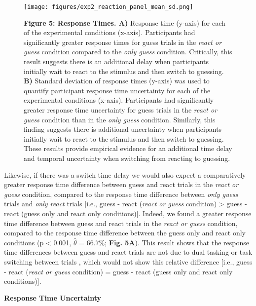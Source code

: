\documentclass[12pt]{article}
\newcommand\boldblue[1]{\textcolor{mydarkblue}{\textbf{#1}}}
\begin{document}
\begin{figure}[H]
    \centering
    \texttt{[image: figures/exp2\_reaction\_panel\_mean\_sd.png]}
    \caption*{\boldblue{Figure 5: Response Times. A)} Response time (y-axis) for each of the experimental conditions (x-axis). Participants had significantly greater response times for guess trials in the \emph{react or guess} condition compared to the \emph{only guess} condition. Critically, this result suggests there is an additional delay when participants initially wait to react to the stimulus and then switch to guessing. \boldblue{B)} Standard deviation of response times (y-axis) was used to quantify participant response time uncertainty for each of the experimental conditions (x-axis). Participants had significantly greater response time uncertainty for guess trials in the \emph{react or guess} condition than in the \emph{only guess} condition. Similarly, this finding suggests there is additional uncertainty when participants initially wait to react to the stimulus and then switch to guessing. These results provide empirical evidence for an additional time delay and temporal uncertainty when switching from reacting to guessing.}
\end{figure}

\vspace*{-4mm}
Likewise, if there was a switch time delay we would also expect a comparatively greater response time difference between guess and react trials in the \emph{react or guess} condition, compared to the response time difference between \emph{only guess} trials and \emph{only react} trials [i.e., guess - react (\emph{react or guess} condition) > guess - react (guess only and react only conditions)]. Indeed, we found a greater response time difference between guess and react trials in the \emph{react or guess} condition, compared to the response time difference between the guess only and react only conditions (p < 0.001, $\hat{\theta}$ = 66.7\%; \boldblue{Fig. 5A}). This result shows that the response time differences between guess and react trials are not due to dual tasking \autocite{vanselstDecisionResponseDualTask1997} or task switching between trials \autocite*{monsellTaskSwitching2003,kieselControlInterferenceTask2010a,rubinsteinExecutiveControlCognitive2001}, which would not show this relative difference  [i.e., guess - react (\emph{react or guess} condition) = guess - react (guess only and react only conditions)].

\noindent \boldblue{Response Time Uncertainty}
\end{document}
